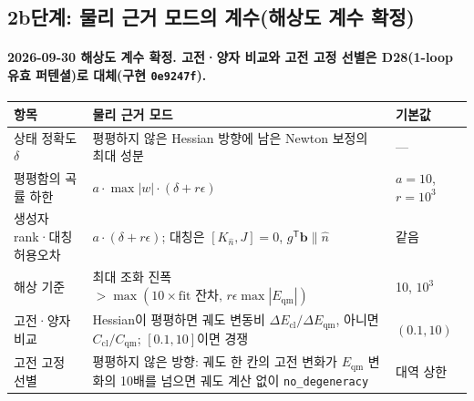 \subsection{2b단계: 물리 근거 모드의 계수(해상도 계수 확정)}\label{stage2b-coefficients}
\begingroup%
    \framesubtitle{2026-09-30 해상도 계수 확정. 고전·양자 비교와 고전 고정 선별은 D28(1-loop 유효 퍼텐셜)로 대체(구현 \texttt{0e9247f}).}
  \small\renewcommand{\arraystretch}{1.1}
  \begin{tabularx}{\textwidth}{@{}P{2.6cm}YP{1.6cm}@{}}
    \toprule
    항목 & 물리 근거 모드 & 기본값 \\
    \midrule
    상태 정확도 $\delta$ & 평평하지 않은 Hessian 방향에 남은 Newton 보정의 최대 성분 & --- \\
    평평함의 곡률 하한 & $a\cdot\max|w|\cdot(\delta+r\epsilon)$ & $a=10$, $r=10^3$ \\
    생성자 rank·대칭 허용오차 & $a\cdot(\delta+r\epsilon)$; 대칭은 $[K_{\hat n},J]=0$, $g^{\mathsf T}\mathbf b\parallel\hat n$ & 같음 \\
    해상 기준 & 최대 조화 진폭 $>\max(10\times\text{fit 잔차},\,r\epsilon\max|E_{\mathrm{qm}}|)$ & 10, $10^3$ \\
    고전·양자 비교 & Hessian이 평평하면 궤도 변동비 $\Delta E_{\mathrm{cl}}/\Delta E_{\mathrm{qm}}$, 아니면 $C_{\mathrm{cl}}/C_{\mathrm{qm}}$; $[0.1,10]$이면 경쟁 & $(0.1,10)$ \\
    고전 고정 선별 & 평평하지 않은 방향: 궤도 한 칸의 고전 변화가 $E_{\mathrm{qm}}$ 변화의 10배를 넘으면 궤도 계산 없이 \texttt{no\_degeneracy} & 대역 상한 \\
    \bottomrule
  \end{tabularx}
  \par\medskip
\endgroup


